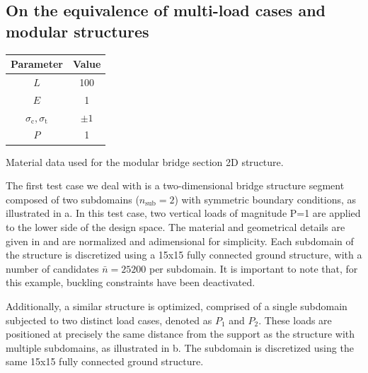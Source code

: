 \subsection{On the equivalence of multi-load cases and modular structures}
\begin{margintable}
    \small
    \centering
    \begin{tabular}{cc}
    \toprule
    \textbf{Parameter}        & \textbf{Value} \\ \midrule
    $L$              & 100     \\
    $E$              & 1     \\
    $\sigma_\text{c}, \sigma_\text{t}$ & $\pm 1$\\
    $P$              & 1   \\
    \bottomrule
    \end{tabular}
    \caption{Material data used for the modular bridge section 2D structure.}
    \label{tab:05_modular_data}
\end{margintable}
The first test case we deal with is a two-dimensional bridge structure segment composed of two subdomains ($n_{\text{sub}} = 2$) with symmetric boundary conditions, as illustrated in a. In this test case, two vertical loads of magnitude P=1 are applied to the lower side of the design space. The material and geometrical details are given in  and are normalized and adimensional for simplicity. Each subdomain of the structure is discretized using a 15x15 fully connected ground structure, with a number of candidates $\bar{n}=25200$ per subdomain. It is important to note that, for this example, buckling constraints have been deactivated.

Additionally, a similar structure is optimized, comprised of a single subdomain subjected to two distinct load cases, denoted as $P_1$ and $P_2$. These loads are positioned at precisely the same distance from the support as the structure with multiple subdomains, as illustrated in b. The subdomain is discretized using the same 15x15 fully connected ground structure.

